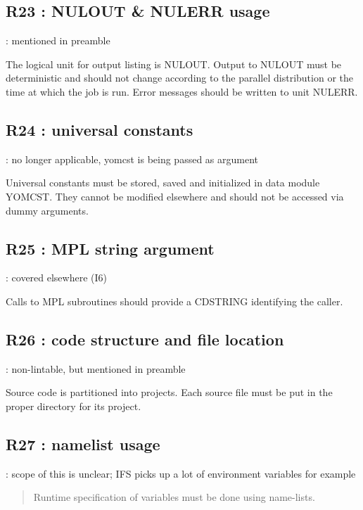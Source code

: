 \documentclass[letterpaper,10pt,english]{sphinxmanual}
\begin{document}
\subsection{R23 :  NULOUT \& NULERR usage}
\label{\detokenize{obsolescent/r23:r23-nulout-nulerr-usage}}\label{\detokenize{obsolescent/r23::doc}}
 : mentioned in preamble

The logical unit for output listing is NULOUT.
Output to NULOUT must be deterministic and should not change according to the
parallel distribution or the time at which the job is run.
Error messages should be written to unit NULERR.


\subsection{R24 : universal constants}
\label{\detokenize{obsolescent/r24:r24-universal-constants}}\label{\detokenize{obsolescent/r24::doc}}
 : no longer applicable, yomcst is being passed as argument

Universal  constants  must  be  stored,  saved  and initialized  in  data  module YOMCST.
They cannot be modified elsewhere and should not be accessed via dummy arguments.


\subsection{R25 :  MPL string argument}
\label{\detokenize{obsolescent/r25:r25-mpl-string-argument}}\label{\detokenize{obsolescent/r25::doc}}
 : covered elsewhere (I6)

Calls to MPL subroutines should provide a CDSTRING identifying the caller.


\subsection{R26 :  code structure and file location}
\label{\detokenize{obsolescent/r26:r26-code-structure-and-file-location}}\label{\detokenize{obsolescent/r26::doc}}
 : non-lintable, but mentioned in preamble

Source code is partitioned into projects.
Each source file must be put in the proper directory for its project.


\subsection{R27 : namelist usage}
\label{\detokenize{obsolescent/r27:r27-namelist-usage}}\label{\detokenize{obsolescent/r27::doc}}
 : scope of this is unclear; IFS picks up a lot of environment variables for example
\begin{quote}

Runtime specification of variables must be done using name-lists.
\end{quote}
\end{document}
